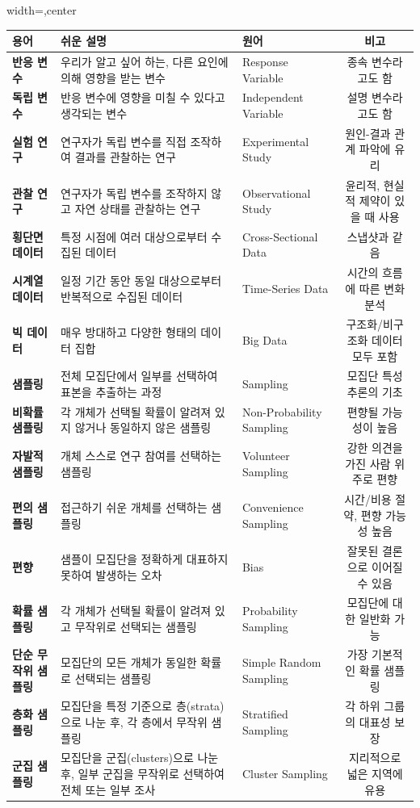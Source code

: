 \documentclass[11pt,a4paper]{book}
\newcommand{\concept}[1]{\textbf{#1}}
\theoremstyle{definition}
\begin{document}
\begin{adjustbox}{width=\textwidth,center}
\begin{tabular}{lllc}
\toprule
\textbf{용어} & \textbf{쉬운 설명} & \textbf{원어} & \textbf{비고} \\
\midrule
\concept{반응 변수} & 우리가 알고 싶어 하는, 다른 요인에 의해 영향을 받는 변수 & Response Variable & 종속 변수라고도 함 \\
\concept{독립 변수} & 반응 변수에 영향을 미칠 수 있다고 생각되는 변수 & Independent Variable & 설명 변수라고도 함 \\
\concept{실험 연구} & 연구자가 독립 변수를 직접 조작하여 결과를 관찰하는 연구 & Experimental Study & 원인-결과 관계 파악에 유리 \\
\concept{관찰 연구} & 연구자가 독립 변수를 조작하지 않고 자연 상태를 관찰하는 연구 & Observational Study & 윤리적, 현실적 제약이 있을 때 사용 \\
\concept{횡단면 데이터} & 특정 시점에 여러 대상으로부터 수집된 데이터 & Cross-Sectional Data & 스냅샷과 같음 \\
\concept{시계열 데이터} & 일정 기간 동안 동일 대상으로부터 반복적으로 수집된 데이터 & Time-Series Data & 시간의 흐름에 따른 변화 분석 \\
\concept{빅 데이터} & 매우 방대하고 다양한 형태의 데이터 집합 & Big Data & 구조화/비구조화 데이터 모두 포함 \\
\concept{샘플링} & 전체 모집단에서 일부를 선택하여 표본을 추출하는 과정 & Sampling & 모집단 특성 추론의 기초 \\
\concept{비확률 샘플링} & 각 개체가 선택될 확률이 알려져 있지 않거나 동일하지 않은 샘플링 & Non-Probability Sampling & 편향될 가능성이 높음 \\
\concept{자발적 샘플링} & 개체 스스로 연구 참여를 선택하는 샘플링 & Volunteer Sampling & 강한 의견을 가진 사람 위주로 편향 \\
\concept{편의 샘플링} & 접근하기 쉬운 개체를 선택하는 샘플링 & Convenience Sampling & 시간/비용 절약, 편향 가능성 높음 \\
\concept{편향} & 샘플이 모집단을 정확하게 대표하지 못하여 발생하는 오차 & Bias & 잘못된 결론으로 이어질 수 있음 \\
\concept{확률 샘플링} & 각 개체가 선택될 확률이 알려져 있고 무작위로 선택되는 샘플링 & Probability Sampling & 모집단에 대한 일반화 가능 \\
\concept{단순 무작위 샘플링} & 모집단의 모든 개체가 동일한 확률로 선택되는 샘플링 & Simple Random Sampling & 가장 기본적인 확률 샘플링 \\
\concept{층화 샘플링} & 모집단을 특정 기준으로 층(strata)으로 나눈 후, 각 층에서 무작위 샘플링 & Stratified Sampling & 각 하위 그룹의 대표성 보장 \\
\concept{군집 샘플링} & 모집단을 군집(clusters)으로 나눈 후, 일부 군집을 무작위로 선택하여 전체 또는 일부 조사 & Cluster Sampling & 지리적으로 넓은 지역에 유용 \\
\bottomrule
\end{tabular}
\end{adjustbox}
\end{document}
